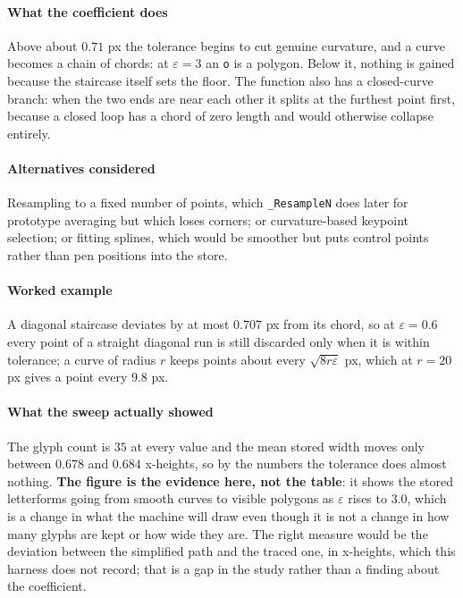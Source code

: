 \paragraph{What the coefficient does}

Above about $0.71$ px the tolerance begins to cut genuine curvature, and a curve becomes a chain of chords: at $\varepsilon = 3$ an \texttt{o} is a polygon. Below it, nothing is gained because the staircase itself sets the floor. The function also has a closed-curve branch: when the two ends are near each other it splits at the furthest point first, because a closed loop has a chord of zero length and would otherwise collapse entirely.

\paragraph{Alternatives considered}

Resampling to a fixed number of points, which \texttt{\_ResampleN} does later for prototype averaging but which loses corners; or curvature-based keypoint selection; or fitting splines, which would be smoother but puts control points rather than pen positions into the store.

\paragraph{Worked example}

A diagonal staircase deviates by at most $0.707$ px from its chord, so at $\varepsilon = 0.6$ every point of a straight diagonal run is still discarded only when it is within tolerance; a curve of radius $r$ keeps points about every $\sqrt{8r\varepsilon}$ px, which at $r = 20$ px gives a point every $9.8$ px.

\paragraph{What the sweep actually showed}

The glyph count is $35$ at every value and the mean stored width moves only between $0.678$ and $0.684$ x-heights, so by the numbers the tolerance does almost nothing. \textbf{The figure is the evidence here, not the table}: it shows the stored letterforms going from smooth curves to visible polygons as $\varepsilon$ rises to $3.0$, which is a change in what the machine will draw even though it is not a change in how many glyphs are kept or how wide they are. The right measure would be the deviation between the simplified path and the traced one, in x-heights, which this harness does not record; that is a gap in the study rather than a finding about the coefficient.

